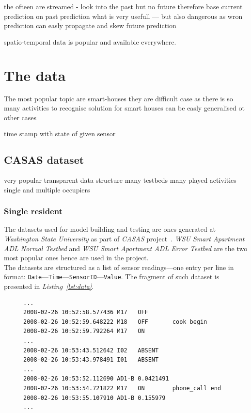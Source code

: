 \documentclass[12pt, a4paper, pdflatex, leqno, twoside, openright]{report}
\begin{document}
the ofteen are streamed - look into the past but no future
therefore base current prediction on past prediction what is very usefull --- but also dangerous as wron prediction can easly propagate and skew future prediction

spatio-temporal data is popular and available everywhere.


  \section{The data}
The most popular topic are smart-houses
they are difficult case as there is so many activities to recognise
solution for smart houses can be easly generalised ot other cases

time stamp with state of given sensor






    \subsection{CASAS dataset}
very popular
transparent data structure
many testbeds 
many played activities
single and multiple occupiers

      \subsubsection{Single resident}

The datasets used for model building and testing are ones generated at \emph{Washington State University} as part of \emph{CASAS} project~\citep{cook2009assessing}. \emph{WSU Smart Apartment ADL Normal Testbed} and \emph{WSU Smart Apartment ADL Error Testbed} are the two most popular ones hence are used in the project.\\

The datasets are structured as a list of sensor readings---one entry per line in format: \texttt{Date}---\texttt{Time}---\texttt{SensorID}---\texttt{Value}. The fragment of such dataset is presented in \emph{Listing~\ref{lst:data}}.

\begin{figure}
\lstset{
  captionpos=b,
  frame=single,
  language=HTML,
  breaklines=true,
  caption=CASAS dataset structure.,
  label=lst:data,
  float=tb
}
\begin{lstlisting}
...
2008-02-26 10:52:58.577436 M17   OFF
2008-02-26 10:52:59.648222 M18   OFF       cook begin
2008-02-26 10:52:59.792264 M17   ON
...
2008-02-26 10:53:43.512642 I02   ABSENT
2008-02-26 10:53:43.978491 I01   ABSENT
...
2008-02-26 10:53:52.112690 AD1-B 0.0421491
2008-02-26 10:53:54.721822 M17   ON        phone_call end
2008-02-26 10:53:55.107910 AD1-B 0.155979
...
\end{lstlisting}
\end{figure}
\end{document}
